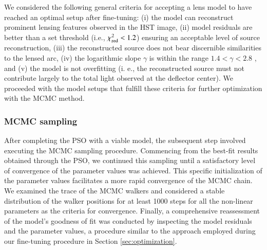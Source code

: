 \documentclass{aa}
\newcommand{\newedit}[1]{{#1}} %
\begin{document}
We considered the following general criteria for accepting a lens model to have reached an optimal setup after fine-tuning: (i) the model can reconstruct prominent lensing features observed in the HST image, (ii) model residuals are better than a set threshold \newedit{(i.e., $\chi_{\rm red}^2 < 1.2$)} ensuring an acceptable level of source reconstruction, (iii) the reconstructed source does not bear discernible similarities to the lensed arc, (iv) the logarithmic slope $\gamma$ is within the range \newedit{$1.4 < \gamma < 2.8$ \citep[following][]{Tan24}}, and (v) the model is not overfitting (i. e., the reconstructed source must not \newedit{contribute largely to the total light observed at the deflector center}). We proceeded with the model setups that fulfill these criteria for further optimization with the MCMC method.




\subsubsection{MCMC sampling}\label{sec:mcmc}

After completing the PSO with a viable model, the subsequent step involved executing the MCMC sampling procedure. Commencing from the best-fit results obtained through the PSO, we continued this sampling until a satisfactory level of convergence of the parameter values was achieved. This specific initialization of the parameter values facilitates a more rapid convergence of the MCMC chain. We examined the trace of the MCMC walkers and considered a stable distribution of the walker positions for at least 1000 steps for all the non-linear parameters as the criteria for convergence. Finally, a comprehensive reassessment of the model's goodness of fit was conducted by inspecting the model residuals and the parameter values, a procedure similar to the approach employed during our fine-tuning procedure in Section \ref{sec:optimization}.
\end{document}

